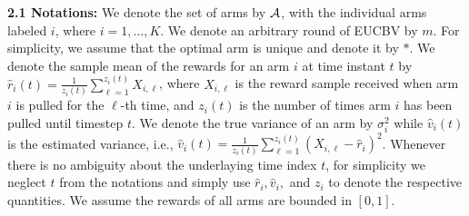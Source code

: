 \textbf{2.1 Notations:} We denote the set of arms by $\mathcal{A}$, with the individual arms labeled $i$, where  $i=1,\ldots,K$. We denote an arbitrary round of EUCBV by $m$. For simplicity, we assume that the optimal arm is unique and denote it by ${*}$. We denote the sample mean of the rewards for an arm $i$ at time instant $t$ by $\hat{r}_{i}(t)=\frac{1}{z_{i}(t)}\sum_{\ell=1}^{z_i(t)} X_{i,\ell}$, where $X_{i,\ell}$ is the reward sample received when arm $i$ is pulled for the $\ell$-th time, and $z_i(t)$ is the number of times arm $i$ has been pulled until timestep $t$. We denote the true variance of an arm by $\sigma_i^{2}$ while $\hat{v}_{i}(t)$ is the estimated variance, i.e., $\hat{v}_{i}(t)=\frac{1}{z_i(t)}\sum_{\ell=1}^{z_{i}(t)}(X_{i,\ell}-\hat{r}_{i})^{2}$. Whenever there is no ambiguity about the underlaying  time index $t$, for simplicity we neglect $t$ from the notations and simply use  $\hat{r}_i, \hat{v}_i,$ and $z_i$ to denote the respective quantities. We assume the rewards of all arms are bounded in $[0,1]$.

